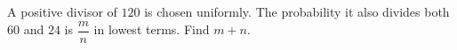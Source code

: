 A positive divisor of $120$ is chosen uniformly. The probability it also divides both $60$ and $24$ is $\dfrac{m}{n}$ in lowest terms. Find $m+n$.
